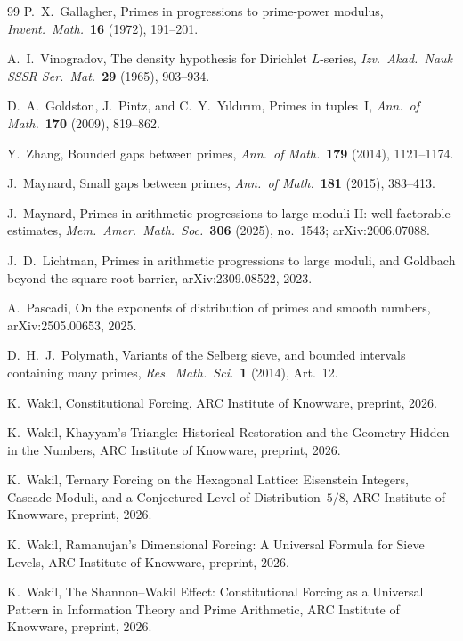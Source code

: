 \documentclass[12pt]{amsart}
\theoremstyle{plain}
\theoremstyle{definition}
\theoremstyle{remark}
\begin{document}
\begin{thebibliography}{99}
P.~X.~Gallagher,
Primes in progressions to prime-power modulus,
\emph{Invent.\ Math.}\ \textbf{16} (1972), 191--201.

A.~I.~Vinogradov,
The density hypothesis for Dirichlet $L$-series,
\emph{Izv.\ Akad.\ Nauk SSSR Ser.\ Mat.}\ \textbf{29} (1965), 903--934.

D.~A.~Goldston, J.~Pintz, and C.~Y.~Y{\i}ld{\i}r{\i}m,
Primes in tuples~I,
\emph{Ann.\ of Math.}\ \textbf{170} (2009), 819--862.

Y.~Zhang,
Bounded gaps between primes,
\emph{Ann.\ of Math.}\ \textbf{179} (2014), 1121--1174.

J.~Maynard,
Small gaps between primes,
\emph{Ann.\ of Math.}\ \textbf{181} (2015), 383--413.

J.~Maynard,
Primes in arithmetic progressions to large moduli II: well-factorable
estimates,
\emph{Mem.\ Amer.\ Math.\ Soc.}\ \textbf{306} (2025), no.~1543;
arXiv:2006.07088.

J.~D.~Lichtman,
Primes in arithmetic progressions to large moduli, and Goldbach beyond the
square-root barrier,
arXiv:2309.08522, 2023.

A.~Pascadi,
On the exponents of distribution of primes and smooth numbers,
arXiv:2505.00653, 2025.

D.~H.~J.~Polymath,
Variants of the Selberg sieve, and bounded intervals containing many primes,
\emph{Res.\ Math.\ Sci.}\ \textbf{1} (2014), Art.~12.


K.~Wakil,
Constitutional Forcing,
ARC Institute of Knowware, preprint, 2026.

K.~Wakil,
Khayyam's Triangle: Historical Restoration and the Geometry Hidden in the
Numbers,
ARC Institute of Knowware, preprint, 2026.

K.~Wakil,
Ternary Forcing on the Hexagonal Lattice: Eisenstein Integers, Cascade
Moduli, and a Conjectured Level of Distribution~$5/8$,
ARC Institute of Knowware, preprint, 2026.

K.~Wakil,
Ramanujan's Dimensional Forcing: A Universal Formula for Sieve Levels,
ARC Institute of Knowware, preprint, 2026.

K.~Wakil,
The Shannon--Wakil Effect: Constitutional Forcing as a Universal Pattern
in Information Theory and Prime Arithmetic,
ARC Institute of Knowware, preprint, 2026.


\end{thebibliography}
\end{document}
